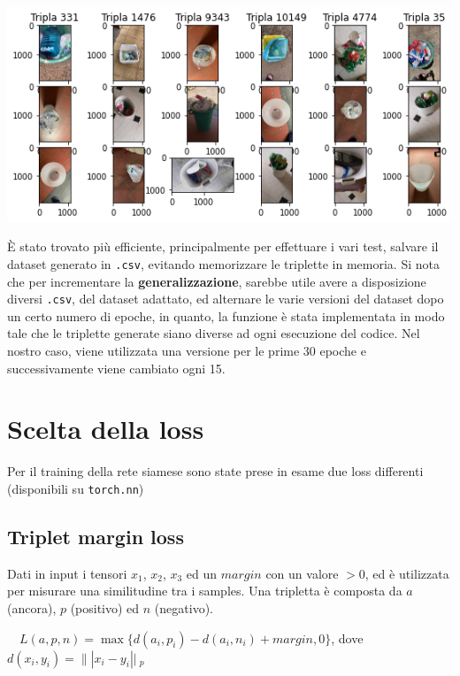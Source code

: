 \documentclass[11pt]{article}
\begin{document}
\begin{center}
    \begin{minipage}{0.6\linewidth}
    \includegraphics[width=\linewidth]{triplet_dataset.png}
    \end{minipage}
\end{center}

È stato trovato più efficiente, principalmente per effettuare i vari test, salvare il dataset generato in
\texttt{.csv}, evitando memorizzare le triplette in memoria. Si nota che per incrementare la \textbf{generalizzazione}, sarebbe utile avere a disposizione diversi
\texttt{.csv}, del dataset adattato, ed alternare le varie versioni del dataset dopo un certo numero di epoche, 
in quanto, la funzione è stata implementata in modo tale che le triplette generate siano diverse ad ogni esecuzione del codice. Nel nostro caso, viene utilizzata
una versione per le prime 30 epoche e successivamente viene cambiato ogni 15.

\pagebreak
\section{Scelta della loss}

Per il training della rete siamese sono state prese in esame due loss differenti (disponibili su \texttt{torch.nn})

\subsection{Triplet margin loss}
Dati in input i tensori $x_1$, $x_2$, $x_3$ ed un $margin$ con un valore $> 0$, ed è
utilizzata per misurare una similitudine tra i samples.
Una tripletta è composta da $a$ (ancora), $p$ (positivo) ed $n$ (negativo). 
\begin{center}
    \ \
    $L(a,p,n) = \max{ \{ d(a_i, p_i) - d(a_i, n_i) + margin, 0 \} }$, dove \ \
    \\
    $d(x_i, y_i) = \|| x_i - y_i ||\ _p$
    \ \
\end{center}
\end{document}
